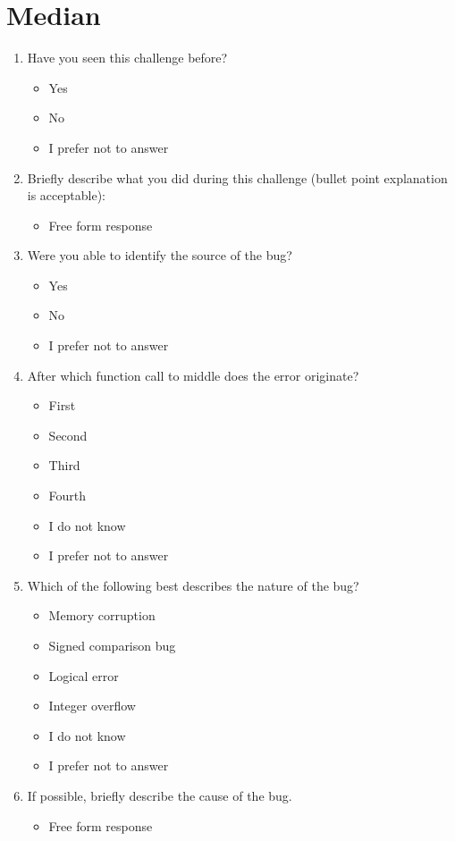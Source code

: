 \section{Median}
\begin{enumerate}
    \item Have you seen this challenge before?
    \begin{itemize}
        \item Yes
        \item No
        \item I prefer not to answer
    \end{itemize}
    \item Briefly describe what you did during this challenge (bullet point explanation is acceptable):
    \begin{itemize}
        \item Free form response
    \end{itemize}
    \item Were you able to identify the source of the bug?
    \begin{itemize}
        \item Yes
        \item No
        \item I prefer not to answer
    \end{itemize}
    \item After which function call to middle does the error originate?
    \begin{itemize}
        \item First
        \item Second
        \item Third
        \item Fourth
        \item I do not know
        \item I prefer not to answer
    \end{itemize}
    \item Which of the following best describes the nature of the bug?
    \begin{itemize}
        \item Memory corruption
        \item Signed comparison bug
        \item Logical error
        \item Integer overflow
        \item I do not know
        \item I prefer not to answer
    \end{itemize}
    \item If possible, briefly describe the cause of the bug.
    \begin{itemize}
        \item Free form response
    \end{itemize}
\end{enumerate}

